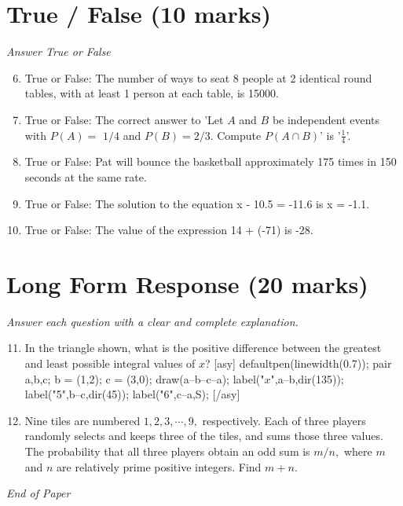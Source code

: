\documentclass[12pt]{article}
\begin{document}
\section*{True / False (10 marks)}
\textit{Answer True or False}
\begin{enumerate}[label=\arabic*.]
\setcounter{enumi}{5}
\item True or False: The number of ways to seat 8 people at 2 identical round tables, with at least 1 person at each table, is 15000.
\item True or False: The correct answer to 'Let $A$ and $B$ be independent events with $P(A)=$ $1 / 4$ and $P(B)=2 / 3$. Compute $P(A \cap B)$' is '$\frac{1}{4}$'.
\item True or False: Pat will bounce the basketball approximately 175 times in 150 seconds at the same rate.
\item True or False: The solution to the equation x - 10.5 = -11.6 is x = -1.1.
\item True or False: The value of the expression 14 + (-71) is -28.
\end{enumerate}

\section*{Long Form Response (20 marks)}
\textit{Answer each question with a clear and complete explanation.}
\begin{enumerate}[label=\arabic*.]
\setcounter{enumi}{10}
\item In the triangle shown, what is the positive difference between the greatest and least possible integral values of $x$? [asy] defaultpen(linewidth(0.7)); pair a,b,c; b = (1,2); c = (3,0); draw(a--b--c--a); label("$x$",a--b,dir(135)); label("5",b--c,dir(45)); label("6",c--a,S); [/asy]
\item Nine tiles are numbered $1, 2, 3, \cdots, 9,$ respectively. Each of three players randomly selects and keeps three of the tiles, and sums those three values. The probability that all three players obtain an odd sum is $m/n,$ where $m$ and $n$ are relatively prime positive integers. Find $m+n.$
\end{enumerate}

\vfill
\noindent\textit{End of Paper}
\end{document}
